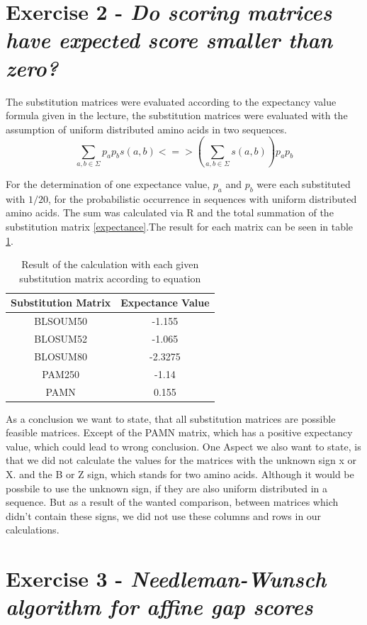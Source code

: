 \documentclass[%
   10pt,              %
   nenglish,           %
   a4paper,           %
   DIV11,             %
]{scrartcl}%
\begin{document}
 \section*{Exercise 2 - \textsl{Do scoring matrices have expected score smaller than zero?}}
 
 The substitution matrices were evaluated according to the expectancy value formula given in the lecture, the substitution matrices were evaluated with the assumption of uniform distributed amino acids in two sequences.
 \begin{equation*}
 \sum_{a,b \in \Sigma}p_a p_b s(a,b)
 <=>  (\sum_{a,b \in \Sigma} s(a,b))  p_a p_b
 \label{expectance}
 \end{equation*}
 
 For the determination of one expectance value, $p_a$ and $p_b$ were each substituted with $1/20$, for the probabilistic occurrence in sequences with uniform distributed amino acids. The sum was calculated via R and the total summation of the substitution matrix \ref{expectance}.The result for each matrix can be seen in table \ref{Results-Expectance}.
 
 \begin{table}[h]
 \begin{tabular}{|c|c|}
 	\hline \rule[-2ex]{0pt}{5.5ex} Substitution Matrix & Expectance Value \\ 
 	\hline \rule[-2ex]{0pt}{5.5ex} BLSOUM50 & -1.155 \\ 
 	\hline \rule[-2ex]{0pt}{5.5ex} BLOSUM52 & -1.065 \\ 
 	\hline \rule[-2ex]{0pt}{5.5ex} BLOSUM80 & -2.3275 \\ 
 	\hline \rule[-2ex]{0pt}{5.5ex} PAM250 & -1.14 \\ 
 	\hline \rule[-2ex]{0pt}{5.5ex} PAMN & 0.155 \\ 
 	\hline 
 \end{tabular} 
 
   	\label{Results-Expectance}
   	\caption{Result of the calculation with each given substitution matrix according to equation}
 \end{table}
 
 As a conclusion we want to state, that all substitution matrices are possible feasible matrices. Except of the PAMN matrix, which has a positive expectancy value, which could lead to wrong conclusion.
One Aspect we also want to state, is that we did not calculate the values for the matrices with the unknown sign x or X. and the B or Z sign,  which stands for two amino acids. Although it would be possbile to use the unknown sign, if they are also uniform distributed in a sequence. But as a result of the wanted comparison, between matrices which didn't contain these signs, we did not use these columns and rows in our calculations.
 
 \section*{Exercise 3 - \textsl{Needleman-Wunsch algorithm for affine gap scores}}
 
  
\end{document}
